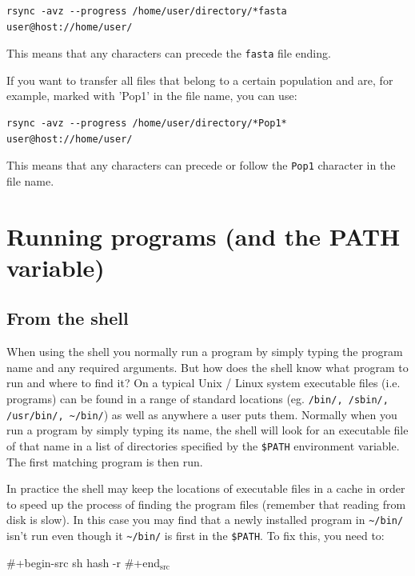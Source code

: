 \documentclass[11pt]{article}
\begin{document}
\begin{verbatim}
rsync -avz --progress /home/user/directory/*fasta user@host://home/user/
\end{verbatim}
This means that any characters can precede the \texttt{fasta} file ending.



If you want to transfer all files that belong to a certain population
and are, for example, marked with 'Pop1' in the file name, you can use:

\begin{verbatim}
rsync -avz --progress /home/user/directory/*Pop1* user@host://home/user/
\end{verbatim}
This means that any characters can precede or follow the \texttt{Pop1}
character in the file name.

\section{Running programs (and the PATH variable)}
\label{sec:orgheadline19}
\subsection{From the shell}
\label{sec:orgheadline16}
When using the shell you normally run a program by simply typing the
program name and any required arguments. But how does the shell know
what program to run and where to find it? On a typical Unix / Linux
system executable files (i.e. programs) can be found in a range of
standard locations (eg. \texttt{/bin/, /sbin/, /usr/bin/, \textasciitilde{}/bin/}) as well as
anywhere a user puts them. Normally when you run a program by simply
typing its name, the shell will look for an executable file of that name
in a list of directories specified by the \texttt{\$PATH} environment variable.
The first matching program is then run.

In practice the shell may keep the locations of executable files in
a cache in order to speed up the process of finding the program files
(remember that reading from disk is slow). In this case you may find
that a newly installed program in \texttt{\textasciitilde{}/bin/} isn't run even though it
\texttt{\textasciitilde{}/bin/} is first in the \texttt{\$PATH}. To fix this, you need to:

\#+begin-src sh
hash -r
\#+end\(_{\text{src}}\)
\end{document}
